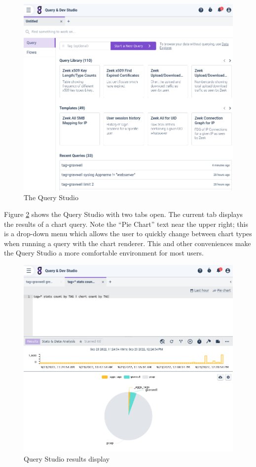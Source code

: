 \begin{figure}
	\includegraphics[width=0.9\linewidth]{images/query-studio.png}
	\caption{The Query Studio}
	\label{fig:query-studio}
\end{figure}

Figure \ref{fig:query-studio-results} shows the Query Studio with two tabs open. The current tab displays the results of a chart query. Note the ``Pie Chart'' text near the upper right; this is a drop-down menu which allows the user to quickly change between chart types when running a query with the chart renderer. This and other conveniences make the Query Studio a more comfortable environment for most users.

\begin{figure}
	\includegraphics[width=0.9\linewidth]{images/query-studio-results.png}
	\caption{Query Studio results display}
	\label{fig:query-studio-results}
\end{figure}

